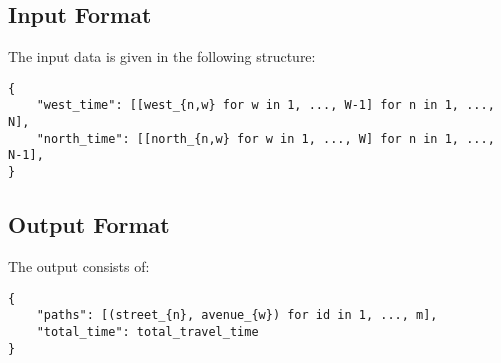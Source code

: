 \documentclass{article}
\begin{document}
\subsection*{Input Format}
The input data is given in the following structure:
\begin{verbatim}
{
    "west_time": [[west_{n,w} for w in 1, ..., W-1] for n in 1, ..., N],
    "north_time": [[north_{n,w} for w in 1, ..., W] for n in 1, ..., N-1],
}
\end{verbatim}

\subsection*{Output Format}
The output consists of:
\begin{verbatim}
{
    "paths": [(street_{n}, avenue_{w}) for id in 1, ..., m],
    "total_time": total_travel_time
}
\end{verbatim}
\end{document}
